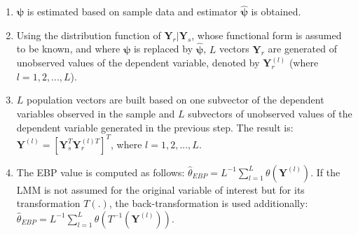 \begin{enumerate}
	\item $\boldsymbol{\psi}$ is estimated based on sample data and estimator $\boldsymbol{\hat{\psi}}$ is obtained.
	\item Using the distribution function of $\mathbf{Y}_r|\mathbf{Y}_s$, whose functional form is assumed to be known, and where $\boldsymbol{\psi}$ is replaced by $\boldsymbol{\hat{\psi}}$, $L$ vectors $\mathbf{Y}_r$ are generated of unobserved values of the dependent variable, denoted by $\mathbf{Y}_r^{(l)}$ (where $l=1,2,...,L$).
	\item $L$ population vectors are built based on one subvector of the dependent variables observed in the sample and $L$ subvectors of unobserved values of the dependent variable generated in the previous step. The result is: $\mathbf{Y}^{(l)} = \left[ \mathbf{Y}_s^T  \mathbf{Y}_r^{(l)T}\right]^T$, where $l=1,2,...,L$.
	\item The EBP value is computed as follows: $\hat\theta_{EBP}={L^{- 1}}\sum\limits_{l = 1}^L \theta (\mathbf{Y}^{(l)})$. If the LMM is not assumed for the original variable of interest but for its transformation $T(.)$, the back-transformation is used additionally: $\hat\theta_{EBP}={L^{- 1}}\sum\limits_{l = 1}^L \theta (T^{-1}(\mathbf{Y}^{(l)}))$.
\end{enumerate}

